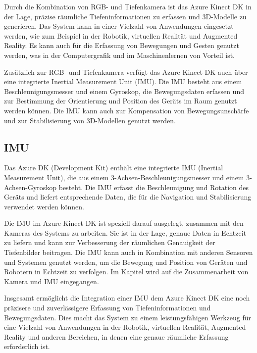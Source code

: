     

    Durch die Kombination von RGB- und Tiefenkamera ist das Azure Kinect \ac{DK} in der Lage, präzise räumliche Tiefeninformationen zu erfassen und 3D-Modelle zu generieren. Das System kann in einer Vielzahl von Anwendungen eingesetzt werden, wie zum Beispiel in der Robotik, virtuellen Realität und Augmented Reality. Es kann auch für die Erfassung von Bewegungen und Gesten genutzt werden, was in der Computergrafik und im Maschinenlernen von Vorteil ist.


    Zusätzlich zur RGB- und Tiefenkamera verfügt das Azure Kinect \ac{DK} auch über eine integrierte Inertial Measurement Unit (\ac{IMU}). Die \ac{IMU} besteht aus einem Beschleunigungsmesser und einem Gyroskop, die Bewegungsdaten erfassen und zur Bestimmung der Orientierung und Position des Geräts im Raum genutzt werden können. Die \ac{IMU} kann auch zur Kompensation von Bewegungsunschärfe und zur Stabilisierung von 3D-Modellen genutzt werden.

\subsection{\acl{IMU}}

Das Azure DK (Development Kit) enthält eine integrierte IMU (Inertial Measurement Unit), die aus einem 3-Achsen-Beschleunigungsmesser und einem 3-Achsen-Gyroskop besteht. Die IMU erfasst die Beschleunigung und Rotation des Geräts und liefert entsprechende Daten, die für die Navigation und Stabilisierung verwendet werden können.

Die \ac{IMU} im Azure Kinect \ac{DK} ist speziell darauf ausgelegt, zusammen mit den Kameras des Systems zu arbeiten. Sie ist in der Lage, genaue Daten in Echtzeit zu liefern und kann zur Verbesserung der räumlichen Genauigkeit der Tiefenbilder beitragen. Die IMU kann auch in Kombination mit anderen Sensoren und Systemen genutzt werden, um die Bewegung und Position von Geräten und Robotern in Echtzeit zu verfolgen.
Im Kapitel  wird auf die Zusammenarbeit von Kamera und IMU eingegangen.

Insgesamt ermöglicht die Integration einer \ac{IMU} dem Azure Kinect \ac{DK} eine noch präzisere und zuverlässigere Erfassung von Tiefeninformationen und Bewegungsdaten. Dies macht das System zu einem leistungsfähigen Werkzeug für eine Vielzahl von Anwendungen in der Robotik, virtuellen Realität, Augmented Reality und anderen Bereichen, in denen eine genaue räumliche Erfassung erforderlich ist.

